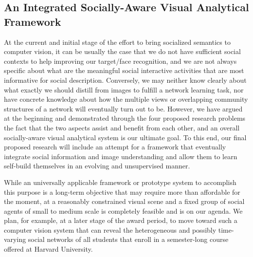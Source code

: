 \subsection{An Integrated Socially-Aware Visual Analytical Framework}

At the current and initial stage of the effort to bring socialized semantics to computer vision, it can be usually the case that we do not have sufficient social contexts to help improving our target/face recognition, and we are not always specific about what are the meaningful social interactive activities that are most informative for social description. Conversely, we may neither know clearly about what exactly we should distill from images to fulfill a network learning task, nor have concrete knowledge about how the multiple views or overlapping community structures of a network will eventually turn out to be. However, we have argued at the beginning and demonstrated through the four proposed research problems the fact that the two aspects assist and benefit from each other, and an overall socially-aware visual analytical system is our ultimate goal. To this end, our final proposed research will include an attempt for a framework that eventually integrate social information and image understanding and allow them to learn self-build themselves in an evolving and unsupervised manner.

While an universally applicable framework or prototype system to accomplish this purpose is a long-term objective that may require more than affordable for the moment, at a reasonably constrained visual scene and a fixed group of social agents of small to medium scale is completely feasible and is on our agenda. We plan, for example, at a later stage of the award period, to move toward such a computer vision system that can reveal the heterogeneous and possibly time-varying social networks of all students that enroll in a semester-long course offered at Harvard University. 

